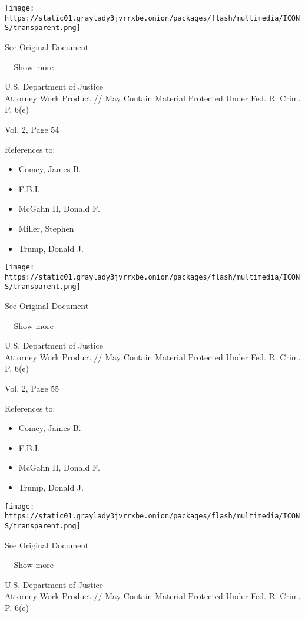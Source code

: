 \protect\hyperlink{}{}

\texttt{[image: https://static01.graylady3jvrrxbe.onion/packages/flash/multimedia/ICONS/transparent.png]}

See Original Document

+ Show more

U.S. Department of Justice\\
Attorney Work Product // May Contain Material Protected Under Fed. R.
Crim. P. 6(e)

Vol. 2, Page 54

References to:

\begin{itemize}
\tightlist
\item
  Comey, James B.
\item
  F.B.I.
\item
  McGahn II, Donald F.
\item
  Miller, Stephen
\item
  Trump, Donald J.
\end{itemize}

\protect\hyperlink{}{}

\texttt{[image: https://static01.graylady3jvrrxbe.onion/packages/flash/multimedia/ICONS/transparent.png]}

See Original Document

+ Show more

U.S. Department of Justice\\
Attorney Work Product // May Contain Material Protected Under Fed. R.
Crim. P. 6(e)

Vol. 2, Page 55

References to:

\begin{itemize}
\tightlist
\item
  Comey, James B.
\item
  F.B.I.
\item
  McGahn II, Donald F.
\item
  Trump, Donald J.
\end{itemize}

\protect\hyperlink{}{}

\texttt{[image: https://static01.graylady3jvrrxbe.onion/packages/flash/multimedia/ICONS/transparent.png]}

See Original Document

+ Show more

U.S. Department of Justice\\
Attorney Work Product // May Contain Material Protected Under Fed. R.
Crim. P. 6(e)


